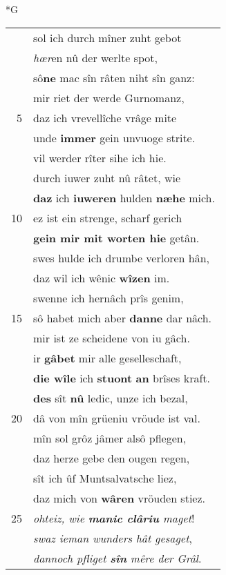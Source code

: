\documentclass[8pt,a4paper,notitlepage]{article}
\begin{document}
\begin{table}[ht]
\begin{minipage}[t]{0.5\linewidth}
\small
\begin{center}*G
\end{center}
\begin{tabular}{rl}
 & sol ich durch mîner zuht gebot\\ 
 & \textit{hœr}en nû der werlte spot,\\ 
 & sô\textbf{ne} mac sîn râten niht sîn ganz:\\ 
 & mir riet der werde Gurnomanz,\\ 
5 & daz ich vrevellîche vrâge mite\\ 
 & unde \textbf{immer} gein unvuoge strite.\\ 
 & vil werder rîter sihe ich hie.\\ 
 & durch iuwer zuht nû râtet, wie\\ 
 & \textbf{daz} ich \textbf{iuweren} hulden \textbf{næhe} mich.\\ 
10 & ez ist ein strenge, scharf gerich\\ 
 & \textbf{gein mir mit worten hie} getân.\\ 
 & swes hulde ich drumbe verloren hân,\\ 
 & daz wil ich wênic \textbf{wîzen} im.\\ 
 & swenne ich hernâch prîs genim,\\ 
15 & sô habet mich aber \textbf{danne} dar nâch.\\ 
 & mir ist ze scheidene von iu gâch.\\ 
 & ir \textbf{gâbet} mir alle geselleschaft,\\ 
 & \textbf{die wîle} ich \textbf{stuont} \textbf{an} brîses kraft.\\ 
 & \textbf{des} sît \textbf{nû} ledic, unze ich bezal,\\ 
20 & dâ von mîn grüeniu vröude ist val.\\ 
 & mîn sol grôz jâmer alsô pflegen,\\ 
 & daz herze gebe den ougen regen,\\ 
 & sît ich ûf Muntsalvatsche liez,\\ 
 & daz mich von \textbf{wâren} vröuden stiez.\\ 
25 & \textit{ohteiz, wie \textbf{manic clâriu} maget}!\\ 
 & \textit{swaz ieman wunders hât gesaget},\\ 
 & \textit{dannoch pfliget \textbf{sîn} mêre der Grâl}.\\ 

\end{tabular}
\end{minipage}
\end{table}
\end{document}
